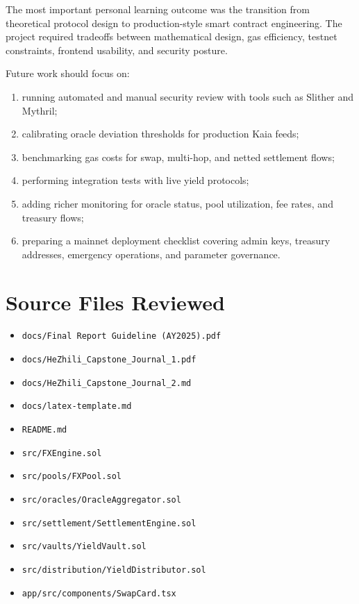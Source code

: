 \documentclass{article}
\begin{document}
The most important personal learning outcome was the transition from theoretical protocol design to production-style smart contract engineering. The project required tradeoffs between mathematical design, gas efficiency, testnet constraints, frontend usability, and security posture.

Future work should focus on:

\begin{enumerate}[leftmargin=*]
\item running automated and manual security review with tools such as Slither and Mythril;
\item calibrating oracle deviation thresholds for production Kaia feeds;
\item benchmarking gas costs for swap, multi-hop, and netted settlement flows;
\item performing integration tests with live yield protocols;
\item adding richer monitoring for oracle status, pool utilization, fee rates, and treasury flows;
\item preparing a mainnet deployment checklist covering admin keys, treasury addresses, emergency operations, and parameter governance.
\end{enumerate}

\appendix

\section{Source Files Reviewed}

\begin{itemize}[leftmargin=*]
\item \texttt{docs/Final Report Guideline (AY2025).pdf}
\item \texttt{docs/HeZhili\_Capstone\_Journal\_1.pdf}
\item \texttt{docs/HeZhili\_Capstone\_Journal\_2.md}
\item \texttt{docs/latex-template.md}
\item \texttt{README.md}
\item \texttt{src/FXEngine.sol}
\item \texttt{src/pools/FXPool.sol}
\item \texttt{src/oracles/OracleAggregator.sol}
\item \texttt{src/settlement/SettlementEngine.sol}
\item \texttt{src/vaults/YieldVault.sol}
\item \texttt{src/distribution/YieldDistributor.sol}
\item \texttt{app/src/components/SwapCard.tsx}
\end{itemize}
\end{document}
